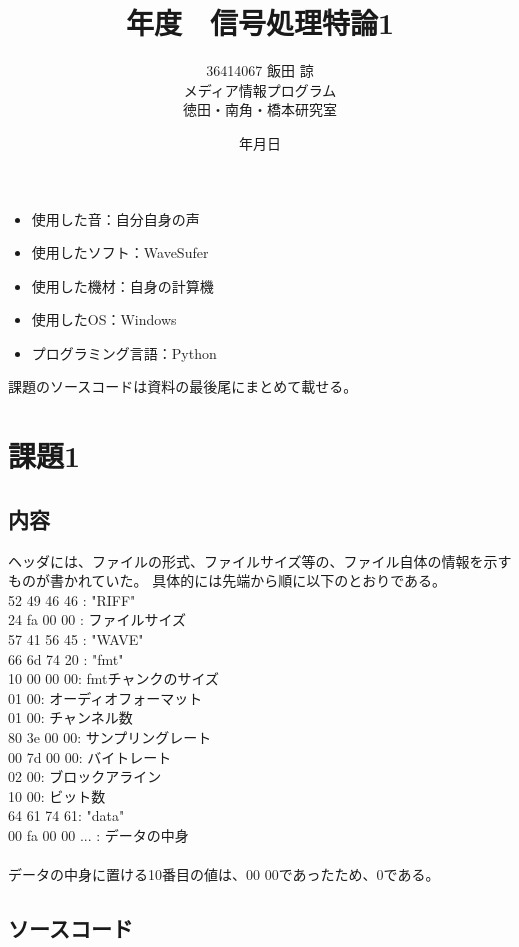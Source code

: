 \documentclass[a4j,11pt]{jarticle}
\title{{\number\year}年度　信号処理特論1}
\date{\number\year 年\number\month 月\number\day 日}
\author{36414067  飯田 諒 \\ メディア情報プログラム\\徳田・南角・橋本研究室}
\begin{document}
    \maketitle
    \thispagestyle{empty}
    \clearpage
    
    \begin{itemize}
        \item 使用した音：自分自身の声
        \item 使用したソフト：WaveSufer
        \item 使用した機材：自身の計算機
        \item 使用したOS：Windows
        \item プログラミング言語：Python
    \end{itemize}
    課題のソースコードは資料の最後尾にまとめて載せる。
    \section{課題1}
    \subsection{内容}
    ヘッダには、ファイルの形式、ファイルサイズ等の、ファイル自体の情報を示すものが書かれていた。
    具体的には先端から順に以下のとおりである。\\
    52 49 46 46 : "RIFF"\\
    24 fa 00 00 : ファイルサイズ\\
    57 41 56 45 : "WAVE"\\
    66 6d 74 20 : "fmt"\\
    10 00 00 00: fmtチャンクのサイズ\\
    01 00: オーディオフォーマット\\
    01 00: チャンネル数\\
    80 3e 00 00: サンプリングレート\\
    00 7d 00 00: バイトレート\\
    02 00: ブロックアライン\\
    10 00: ビット数\\
    64 61 74 61: "data"\\
    00 fa 00 00 ... : データの中身\\
    \\
    データの中身に置ける10番目の値は、00 00であったため、0である。
    \subsection{ソースコード}
    
\end{document}
